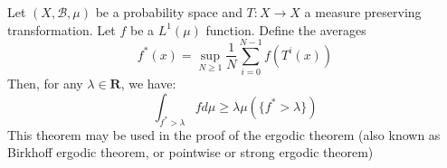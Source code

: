 \documentclass[12pt]{article}
\begin{document}
Let $(X,\mathcal{B},\mu)$ be a probability space and $T:X\rightarrow X$ a measure preserving transformation. Let $f$ be a $L^1(\mu)$ function.
Define the averages 
$$f^*(x)=\sup_{N\geq 1} \frac{1}{N} \sum_{i=0}^{N-1} f(T^i(x))$$
Then, for any $\lambda \in \textbf{R}$, we have:
$$\int_{f^*>\lambda} fd\mu \geq \lambda \mu ( \{f^* > \lambda \} )$$
This theorem may be used in the proof of the ergodic theorem (also known as Birkhoff ergodic theorem, or pointwise or strong ergodic theorem)
\end{document}
